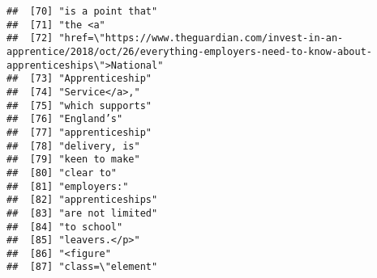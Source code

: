 \documentclass[]{article}
\begin{document}
\begin{verbatim}
##  [70] "is a point that"                                                                                                                          
##  [71] "the <a"                                                                                                                                   
##  [72] "href=\"https://www.theguardian.com/invest-in-an-apprentice/2018/oct/26/everything-employers-need-to-know-about-apprenticeships\">National"
##  [73] "Apprenticeship"                                                                                                                           
##  [74] "Service</a>,"                                                                                                                             
##  [75] "which supports"                                                                                                                           
##  [76] "England’s"                                                                                                                                
##  [77] "apprenticeship"                                                                                                                           
##  [78] "delivery, is"                                                                                                                             
##  [79] "keen to make"                                                                                                                             
##  [80] "clear to"                                                                                                                                 
##  [81] "employers:"                                                                                                                               
##  [82] "apprenticeships"                                                                                                                          
##  [83] "are not limited"                                                                                                                          
##  [84] "to school"                                                                                                                                
##  [85] "leavers.</p>"                                                                                                                             
##  [86] "<figure"                                                                                                                                  
##  [87] "class=\"element"                                                                                                                          

\end{verbatim}
\end{document}
